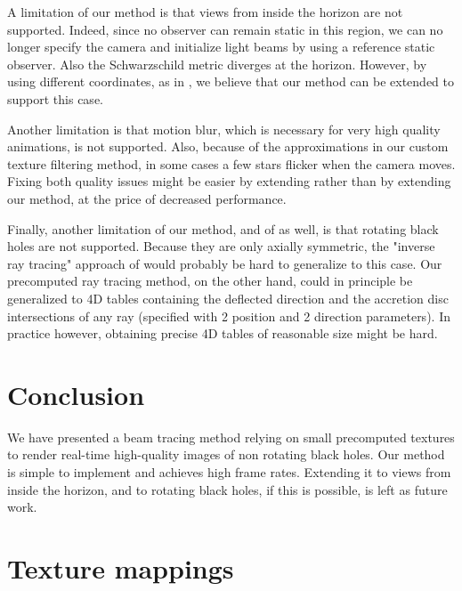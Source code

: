 \documentclass{document}
\begin{document}
A limitation of our method is that views from inside the horizon are not 
supported. Indeed, since no observer can remain static in this region, we can 
no longer specify the camera and initialize light beams by using a reference 
static observer. Also the Schwarzschild metric diverges at the horizon. 
However, by using different coordinates, as in \cite{Muller2010}, we believe 
that our method can be extended to support this case.

Another limitation is that motion blur, which is necessary for very high 
quality animations, is not supported. Also, because of the approximations in 
our custom texture filtering method, in some cases a few stars flicker when the 
camera moves. Fixing both quality issues might be easier by extending 
\cite{Muller2010} rather than by extending our method, at the price of 
decreased performance.

Finally, another limitation of our method, and of \cite{Muller2010} as well, is 
that rotating black holes are not supported. Because they are only axially 
symmetric, the "inverse ray tracing" approach of \cite{Muller2010} would 
probably be hard to generalize to this case. Our precomputed ray tracing 
method, on the other hand, could in principle be generalized to 4D tables 
containing the deflected direction and the accretion disc intersections of any 
ray (specified with 2 position and 2 direction parameters). In practice 
however, obtaining precise 4D tables of reasonable size might be hard.

\section{Conclusion}\label{sec:conclusion}

We have presented a beam tracing method relying on small precomputed textures 
to render real-time high-quality images of non rotating black holes. Our method 
is simple to implement and achieves high frame rates. Extending it to views 
from inside the horizon, and to rotating black holes, if this is possible, is 
left as future work.


\appendix
\section{Texture mappings}\label{sec:texmapping}
\end{document}
